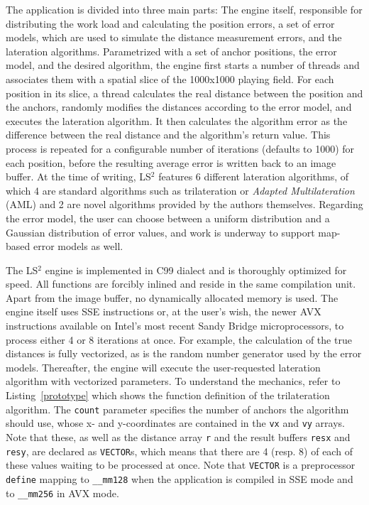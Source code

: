 The application is divided into three main parts: The engine itself, responsible for distributing the work load and calculating the position errors, a set of error models, which are used to simulate the distance measurement errors, and the lateration algorithms. Parametrized with a set of anchor positions, the error model, and the desired algorithm, the engine first starts a number of threads and associates them with a spatial slice of the 1000x1000 playing field. For each position in its slice, a thread calculates the real distance between the position and the anchors, randomly modifies the distances according to the error model, and executes the lateration algorithm. It then calculates the algorithm error as the difference between the real distance and the algorithm's return value. This process is repeated for a configurable number of iterations (defaults to 1000) for each position, before the resulting average error is written back to an image buffer. At the time of writing, LS$^{2}$ features 6 different lateration algorithms, of which 4 are standard algorithms such as trilateration or \emph{Adapted Multilateration} (AML) and 2 are novel algorithms provided by the authors themselves. Regarding the error model, the user can choose between a uniform distribution and a Gaussian distribution of error values, and work is underway to support map-based error models as well.

The LS$^{2}$ engine is implemented in C99 dialect and is thoroughly optimized for speed. All functions are forcibly inlined and reside in the same compilation unit. Apart from the image buffer, no dynamically allocated memory is used. The engine itself uses SSE instructions or, at the user's wish, the newer AVX instructions available on Intel's most recent Sandy Bridge microprocessors, to process either 4 or 8 iterations at once. For example, the calculation of the true distances is fully vectorized, as is the random number generator used by the error models. Thereafter, the engine will execute the user-requested lateration algorithm with vectorized parameters. To understand the mechanics, refer to Listing~\ref{prototype} which shows the function definition of the trilateration algorithm. The \texttt{count} parameter specifies the number of anchors the algorithm should use, whose x- and y-coordinates are contained in the \texttt{vx} and \texttt{vy} arrays. Note that these, as well as the distance array \texttt{r} and the result buffers \texttt{resx} and \texttt{resy}, are declared as \texttt{VECTOR}s, which means that there are 4 (resp. 8) of each of these values waiting to be processed at once. Note that \texttt{VECTOR} is a preprocessor \texttt{define} mapping to \texttt{\_\_mm128} when the application is compiled in SSE mode and to \texttt{\_\_mm256} in AVX mode.

